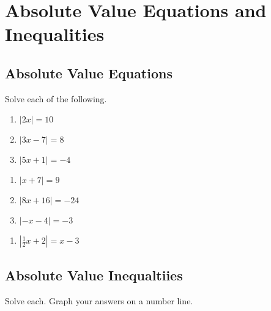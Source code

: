 \chapter{Absolute Value Equations and Inequalities}

\section{Absolute Value Equations}

Solve each of the following.

\begin{multicols}{3}
\begin{enumerate}
	\item $|2x| = 10$
	\item $|3x-7|=8$
	\item $|5x+1| = -4$
\end{enumerate}	\setcounter{Review}{\value{enumi}}
\end{multicols}
\begin{multicols}{3}
\begin{enumerate}	\setcounter{enumi}{\value{Review}}
	\item $|x + 7| = 9$
	\item $|8x+16| = -24$
	\item $|-x-4| = -3$
\end{enumerate}	\setcounter{Review}{\value{enumi}}
\end{multicols}
\begin{multicols}{3}
\begin{enumerate}	\setcounter{enumi}{\value{Review}}
	\item $\left|\frac{1}{2}x + 2\right| = x - 3$
\end{enumerate}	\setcounter{Review}{\value{enumi}}
\end{multicols}



\section{Absolute Value Inequaltiies}

Solve each. Graph your answers on a number line.

